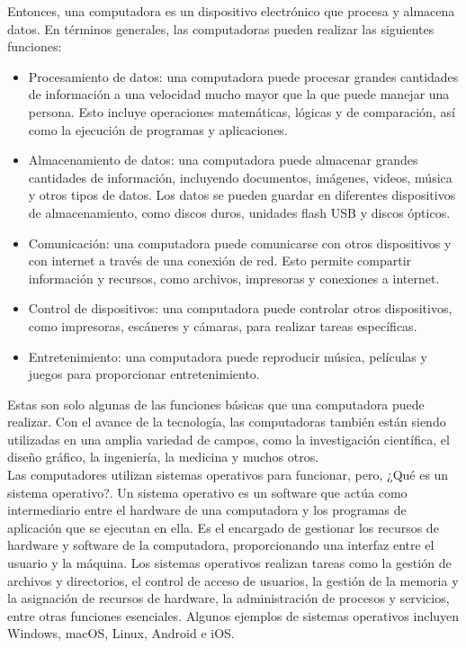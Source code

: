 \documentclass{article}
\begin{document}
Entonces, una computadora es un dispositivo electrónico que procesa y almacena datos. En términos generales, las computadoras pueden realizar las siguientes funciones: \\
\begin{itemize}
    \item Procesamiento de datos: una computadora puede procesar grandes cantidades  de información a una velocidad mucho mayor que la que puede manejar una persona. Esto incluye operaciones matemáticas, lógicas y de comparación, así como la ejecución de programas y aplicaciones.
    \item Almacenamiento de datos: una computadora puede almacenar grandes cantidades de información, incluyendo documentos, imágenes, videos, música y otros tipos de datos. Los datos se pueden guardar en diferentes dispositivos de almacenamiento, como discos duros, unidades flash USB y discos ópticos.
    \item Comunicación: una computadora puede comunicarse con otros dispositivos y con internet a través de una conexión de red. Esto permite compartir información y recursos, como archivos, impresoras y conexiones a internet.
    \item Control de dispositivos: una computadora puede controlar otros dispositivos, como impresoras, escáneres y cámaras, para realizar tareas específicas.
    \item Entretenimiento: una computadora puede reproducir música, películas y juegos para proporcionar entretenimiento.\\
\end{itemize}
        
        
Estas son solo algunas de las funciones básicas que una computadora puede realizar. Con el avance de la tecnología, las computadoras también están siendo utilizadas en una amplia variedad de campos, como la investigación científica, el diseño gráfico, la ingeniería, la medicina y muchos otros.\\

Las computadores utilizan sistemas operativos para funcionar, pero, ¿Qué es un sistema operativo?.
Un sistema operativo es un software que actúa como intermediario entre el hardware de una computadora y los programas de aplicación que se ejecutan en ella. Es el encargado de gestionar los recursos de hardware y software de la computadora, proporcionando una interfaz entre el usuario y la máquina. Los sistemas operativos realizan tareas como la gestión de archivos y directorios, el control de acceso de usuarios, la gestión de la memoria y la asignación de recursos de hardware, la administración de procesos y servicios, entre otras funciones esenciales. Algunos ejemplos de sistemas operativos incluyen Windows, macOS, Linux, Android e iOS.\\
\end{document}
